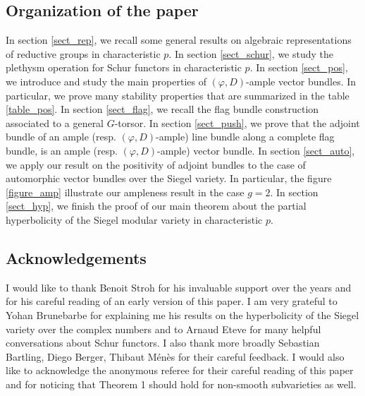 \documentclass[11pt]{amsart}
\numberwithin{subsection}{section}
\numberwithin{figure}{section}
\numberwithin{table}{section}
\theoremstyle{1}
\theoremstyle{2}
\begin{document}
\subsection{Organization of the paper}
In section \ref{sect_rep}, we recall some general results on algebraic representations of reductive groups in characteristic $p$. In section \ref{sect_schur}, we study the plethysm operation for Schur functors in characteristic $p$.  In section \ref{sect_pos}, we introduce and study the main properties of $(\varphi,D)$-ample vector bundles. In particular, we prove many stability properties that are summarized in the table \ref{table_pos}. In section \ref{sect_flag}, we recall the flag bundle construction associated to a general $G$-torsor. In section \ref{sect_push}, we prove that the adjoint bundle of an ample (resp. $(\varphi,D)$-ample) line bundle along a complete flag bundle, is an ample (resp. $(\varphi,D)$-ample) vector bundle. In section \ref{sect_auto}, we apply our result on the positivity of adjoint bundles to the case of automorphic vector bundles over the Siegel variety. In particular, the figure \ref{figure_amp} illustrate our ampleness result in the case $g=2$. In section \ref{sect_hyp}, we finish the proof of our main theorem about the partial hyperbolicity of the Siegel modular variety in characteristic $p$.

\subsection*{Acknowledgements}
I would like to thank Benoit Stroh for his invaluable support over the years and for his careful reading of an early version of this paper. I am very grateful to Yohan Brunebarbe for explaining me his results on the hyperbolicity of the Siegel variety over the complex numbers and to Arnaud Eteve for many helpful conversations about Schur functors. I also thank more broadly Sebastian Bartling, Diego Berger, Thibaut Ménès for their careful feedback. I would also like to acknowledge the anonymous referee for their careful reading of this paper and for noticing that Theorem 1 should hold for non-smooth subvarieties as well.
\end{document}
